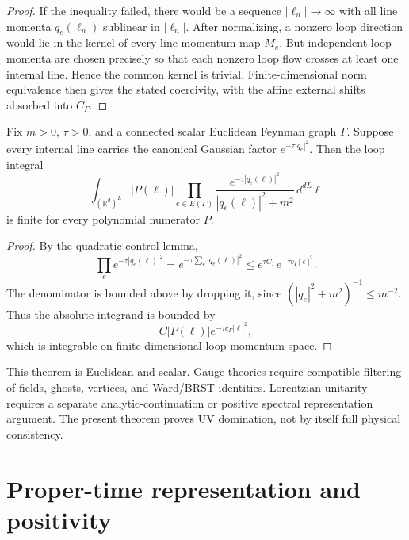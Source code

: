 \documentclass[11pt]{article}
\begin{document}
\begin{proof}
If the inequality failed, there would be a sequence \(|\ell_n|\to\infty\) with all line momenta \(q_e(\ell_n)\) sublinear in \(|\ell_n|\). After normalizing, a nonzero loop direction would lie in the kernel of every line-momentum map \(M_e\). But independent loop momenta are chosen precisely so that each nonzero loop flow crosses at least one internal line. Hence the common kernel is trivial. Finite-dimensional norm equivalence then gives the stated coercivity, with the affine external shifts absorbed into \(C_\Gamma\).
\end{proof}

\begin{theorem}
Fix \(m>0\), \(\tau>0\), and a connected scalar Euclidean Feynman graph \(\Gamma\). Suppose every internal line carries the canonical Gaussian factor \(e^{-\tau |q_e|^2}\). Then the loop integral
\[
        \int_{(\mathbb R^d)^L}
        |P(\ell)|
        \prod_{e\in E(\Gamma)}
        \frac{e^{-\tau |q_e(\ell)|^2}}
        {|q_e(\ell)|^2+m^2}
        \,d^{dL}\ell
\]
is finite for every polynomial numerator \(P\).
\end{theorem}

\begin{proof}
By the quadratic-control lemma,
\[
        \prod_e e^{-\tau |q_e(\ell)|^2}
        =
        e^{-\tau\sum_e |q_e(\ell)|^2}
        \le
        e^{\tau C_\Gamma}e^{-\tau c_\Gamma|\ell|^2}.
\]
The denominator is bounded above by dropping it, since \((|q_e|^2+m^2)^{-1}\le m^{-2}\). Thus the absolute integrand is bounded by
\[
        C |P(\ell)|e^{-\tau c_\Gamma|\ell|^2},
\]
which is integrable on finite-dimensional loop-momentum space.
\end{proof}

\begin{remark}
This theorem is Euclidean and scalar. Gauge theories require compatible filtering of fields, ghosts, vertices, and Ward/BRST identities. Lorentzian unitarity requires a separate analytic-continuation or positive spectral representation argument. The present theorem proves UV domination, not by itself full physical consistency.
\end{remark}

\section{Proper-time representation and positivity}
\end{document}
